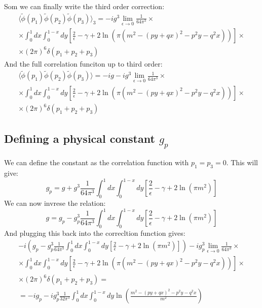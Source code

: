 \documentclass{article}
\begin{document}
Som we can finally write the third order correction:
\begin{equation}
\begin{gathered}
    \langle \tilde{\phi}(p_1) \tilde{\phi}(p_2) \tilde{\phi}(p_3) \rangle_3 =
    -ig^3 \lim_{\epsilon \rightarrow 0}
    \frac{1}{64\pi^3}
    \times \\ \times
    \int_0^1 dx \int_0^{1-x} dy
    \left[\frac{2}{\epsilon} - \gamma + 2\ln(\pi \left(m^2 - (py + qx)^2 - p^2y - q^2x\right))\right]
    \times \\ \times
    (2\pi)^6\delta \left(p_1 + p_2 + p_3\right)
\end{gathered}
\end{equation}
And the full correlation funciton up to third order:
\begin{equation}
\begin{gathered}
    \langle \tilde{\phi}(p_1) \tilde{\phi}(p_2) \tilde{\phi}(p_3) \rangle =
    -ig - ig^3 \lim_{\epsilon \rightarrow 0}
    \frac{1}{64\pi^3}
    \times \\ \times
    \int_0^1 dx \int_0^{1-x} dy
    \left[\frac{2}{\epsilon} - \gamma + 2\ln(\pi \left(m^2 - (py + qx)^2 - p^2y - q^2x\right))\right]
    \times \\ \times
    (2\pi)^6\delta \left(p_1 + p_2 + p_3\right)
\end{gathered}
\end{equation}
\subsection{Defining a physical constant $g_p$}
We can define the constant as the correlation function with $p_1 = p_3 = 0$. This will give:
\begin{equation}
    g_p = g + g^3 \frac{1}{64\pi^3} \int_0^1 dx \int_0^{1-x} dy
    \left[\frac{2}{\epsilon} - \gamma + 2\ln(\pi m^2)\right]
\end{equation}
We can now invrese the relation:
\begin{equation}
    g = g_p - g_p^3\frac{1}{64\pi^3} \int_0^1 dx \int_0^{1-x} dy
    \left[\frac{2}{\epsilon} - \gamma + 2\ln(\pi m^2)\right]
\end{equation}
And plugging this back into the correcltion function gives:
\begin{equation}
\begin{gathered}
    -i\left(g_p - g_p^3\frac{1}{64\pi^3} \int_0^1 dx \int_0^{1-x} dy
    \left[\frac{2}{\epsilon} - \gamma + 2\ln(\pi m^2)\right]\right)
    - ig_p^3 \lim_{\epsilon \rightarrow 0}
    \frac{1}{64\pi^3}
    \times \\ \times
    \int_0^1 dx \int_0^{1-x} dy
    \left[\frac{2}{\epsilon} - \gamma + 2\ln(\pi \left(m^2 - (py + qx)^2 - p^2y - q^2x\right))\right]
    \times \\ \times
    (2\pi)^6\delta \left(p_1 + p_2 + p_3\right) = \\ =
    -ig_p - ig_p^3 \frac{1}{32\pi^3}
    \int_0^1 dx \int_0^{1-x} dy
    \ln(\frac{m^2 - (py + qx)^2 - p^2y - q^2x}{m^2})
\end{gathered}
\end{equation}
\end{document}

